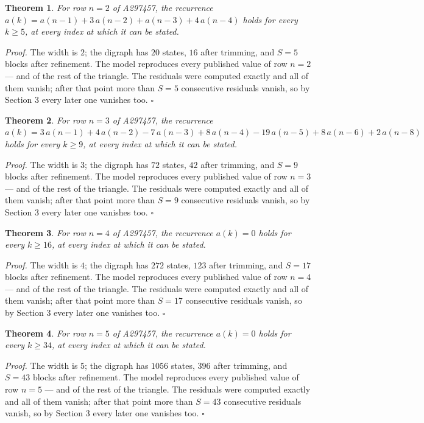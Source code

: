 \documentclass[11pt]{article}
\newtheorem{theorem}{Theorem}
\theoremstyle{definition}
\begin{document}
\begin{theorem} For row $n = 2$ of A297457, the recurrence $a(k) = a(n-1) + 3\,a(n-2) + a(n-3) + 4\,a(n-4)$ holds for every $k \ge 5$, at every index at which it can be stated.\end{theorem}

{\itshape Proof.} The width is $2$; the digraph has $20$ states, $16$ after trimming, and $S = 5$ blocks after refinement. The model reproduces every published value of row $n = 2$ --- and of the rest of the triangle. The residuals were computed exactly and all of them vanish; after that point more than $S = 5$ consecutive residuals vanish, so by Section 3 every later one vanishes too. $\square$

\begin{theorem} For row $n = 3$ of A297457, the recurrence $a(k) = 3\,a(n-1) + 4\,a(n-2) - 7\,a(n-3) + 8\,a(n-4) - 19\,a(n-5) + 8\,a(n-6) + 2\,a(n-8)$ holds for every $k \ge 9$, at every index at which it can be stated.\end{theorem}

{\itshape Proof.} The width is $3$; the digraph has $72$ states, $42$ after trimming, and $S = 9$ blocks after refinement. The model reproduces every published value of row $n = 3$ --- and of the rest of the triangle. The residuals were computed exactly and all of them vanish; after that point more than $S = 9$ consecutive residuals vanish, so by Section 3 every later one vanishes too. $\square$

\begin{theorem} For row $n = 4$ of A297457, the recurrence $a(k) = 0$ holds for every $k \ge 16$, at every index at which it can be stated.\end{theorem}

{\itshape Proof.} The width is $4$; the digraph has $272$ states, $123$ after trimming, and $S = 17$ blocks after refinement. The model reproduces every published value of row $n = 4$ --- and of the rest of the triangle. The residuals were computed exactly and all of them vanish; after that point more than $S = 17$ consecutive residuals vanish, so by Section 3 every later one vanishes too. $\square$

\begin{theorem} For row $n = 5$ of A297457, the recurrence $a(k) = 0$ holds for every $k \ge 34$, at every index at which it can be stated.\end{theorem}

{\itshape Proof.} The width is $5$; the digraph has $1056$ states, $396$ after trimming, and $S = 43$ blocks after refinement. The model reproduces every published value of row $n = 5$ --- and of the rest of the triangle. The residuals were computed exactly and all of them vanish; after that point more than $S = 43$ consecutive residuals vanish, so by Section 3 every later one vanishes too. $\square$
\end{document}

